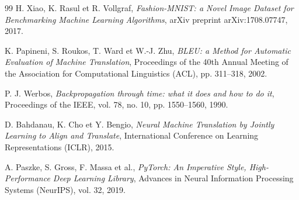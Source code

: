 \documentclass[11pt,a4paper]{article}
\begin{document}
\begin{thebibliography}{99}
H. Xiao, K. Rasul et R. Vollgraf,
\textit{Fashion-MNIST: a Novel Image Dataset for Benchmarking Machine Learning
Algorithms},
arXiv preprint arXiv:1708.07747, 2017.

K. Papineni, S. Roukos, T. Ward et W.-J. Zhu,
\textit{BLEU: a Method for Automatic Evaluation of Machine Translation},
Proceedings of the 40th Annual Meeting of the Association for Computational
Linguistics (ACL), pp. 311--318, 2002.

P. J. Werbos,
\textit{Backpropagation through time: what it does and how to do it},
Proceedings of the IEEE, vol. 78, no. 10, pp. 1550--1560, 1990.

D. Bahdanau, K. Cho et Y. Bengio,
\textit{Neural Machine Translation by Jointly Learning to Align and Translate},
International Conference on Learning Representations (ICLR), 2015.

A. Paszke, S. Gross, F. Massa et al.,
\textit{PyTorch: An Imperative Style, High-Performance Deep Learning Library},
Advances in Neural Information Processing Systems (NeurIPS), vol. 32, 2019.

\end{thebibliography}

\end{document}
